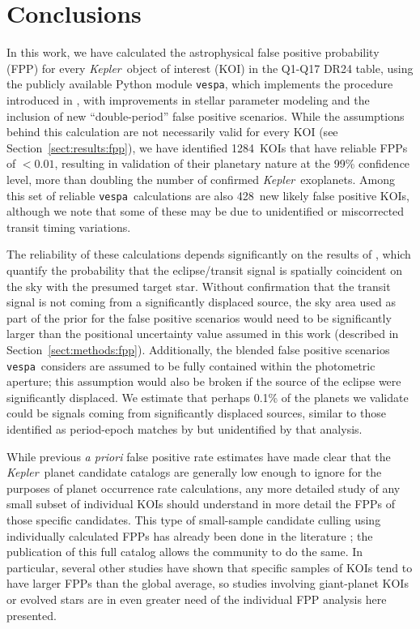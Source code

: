 \documentclass{emulateapj}
\newcommand{\sectionname}{Section}
\newcommand{\Sect}[1]{\sectionname~\ref{sect:#1}}
\newcommand{\sect}[1]{\Sect{#1}}
\newcommand{\sectlabel}[1]{\label{sect:#1}}
\newcommand{\nvalnew}{1284} %
\newcommand{\nfpnew}{428}  %
\newcommand{\kepler}{\textit{Kepler}}
\newcommand{\vespa}{\texttt{vespa}}
\begin{document}



\section{Conclusions}
\sectlabel{conclusions}

In this work, we have calculated the astrophysical false positive
probability (FPP) for every \kepler\ object of interest (KOI) in the
Q1-Q17 DR24 table, using the publicly available Python module
\vespa, which implements the procedure introduced in
\citet{Morton:2012}, with improvements in stellar parameter modeling
and the inclusion of new ``double-period'' false positive scenarios.
While the assumptions behind this calculation are not necessarily
valid for every KOI (see \sect{results:fpp}), we have identified
\nvalnew\ KOIs that have reliable FPPs of $< 0.01$, resulting in
validation of their planetary nature at the 99\% confidence level,
more than doubling the number of confirmed \kepler\ exoplanets.  Among
this set of reliable \vespa\ calculations are also \nfpnew\ new likely
false positive KOIs, although we note that some of these may be due to
unidentified or miscorrected transit timing variations.  

The reliability of these calculations depends significantly on the
results of \citet{Bryson:KSCI}, which quantify the probability that
the eclipse/transit signal is spatially coincident on the sky with the
presumed target star.  Without confirmation that the transit signal is
not coming from a significantly displaced source, the sky area used as
part of the prior for the false positive scenarios would need to be
significantly larger than the positional uncertainty value assumed in
this work (described in \sect{methods:fpp}).  Additionally, the
blended false positive scenarios \vespa\ considers are assumed to be
fully contained within the photometric aperture; this assumption would
also be broken if the source of the eclipse were significantly
displaced.  We estimate that perhaps 0.1\% of the planets we validate
could be signals coming from significantly displaced sources, similar 
to those identified as period-epoch matches by \citet{Coughlin:2014}
but unidentified by that analysis.

While previous \emph{a priori} false positive rate estimates
\citep{Morton:2011b,Fressin:2013} have made clear that the \kepler\
planet candidate catalogs are generally low enough to ignore for the
purposes of planet occurrence rate calculations, any more detailed
study of any small subset of individual KOIs should understand in more
detail the FPPs of those specific candidates.  This type of small-sample 
candidate culling using individually calculated FPPs has
already been done in the literature
\citep{MortonSwift:2014,MortonWinn:2014}; the publication of this full
catalog allows the community to do the same.  In particular, several
other studies have shown that specific samples of KOIs tend to have
larger FPPs than the global average, so studies involving giant-planet
KOIs \citep{Santerne:2015} or evolved stars \citep{Sliski:2014} are in
even greater need of the individual FPP analysis here presented.
\end{document}
